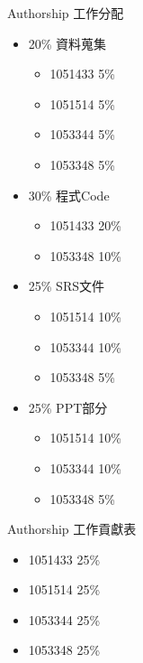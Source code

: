 \documentclass{beamer}
\begin{document}
\begin{CJK*}{UTF8}{bsmi}
\begin{frame}{Authorship }{工作分配}
\begin{itemize}
  \item{
   20\% 資料蒐集
	\begin{itemize}
  	\item{
		1051433  5\%
           }
	\item{
		1051514  5\%
           }
	\item{
		1053344  5\%
           }
	\item{
		1053348  5\%
           }
 	 \end{itemize}
}
  \item {
  30\% 程式Code
	\begin{itemize}
  	\item{
		1051433  20\%
           }
	\item{
		1053348  10\%
           }
 	 \end{itemize}
  }
  \item {
   25\% SRS文件
	\begin{itemize}
	\item{
		1051514  10\%
           }
	\item{
		1053344  10\%
           }
	\item{
		1053348  5\%
           }
 	 \end{itemize}
  }
 \item{
  25\% PPT部分
	\begin{itemize}
	\item{
		1051514  10\%
           }
	\item{
		1053344  10\%
           }
	\item{
		1053348  5\%
           }
 	 \end{itemize}	
}
 \end{itemize}
\end{frame}
\end{CJK*}

\begin{CJK*}{UTF8}{bsmi}
\begin{frame}{Authorship }{工作貢獻表}
\begin{itemize}
  \item{
  1051433   25\%
}
  \item {
  1051514   25\%
  }
  \item {
  1053344   25\%
  }
 \item{
 1053348   25\%
}
 \end{itemize}

\end{frame}
\end{CJK*}
\end{document}
